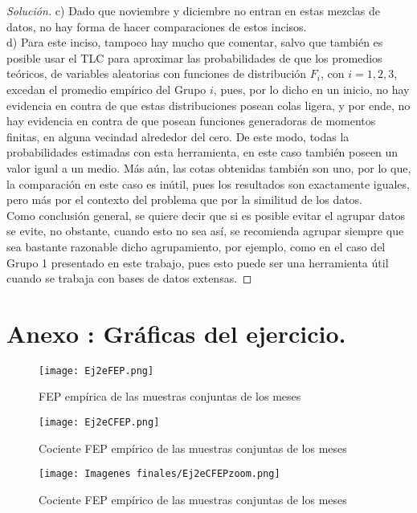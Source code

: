 \documentclass[10.5pt,notitlepage]{article}
\newenvironment{solucion}
  {\begin{proof}[Solución]}
  {\end{proof}}
\theoremstyle{plain}
\begin{document}
\begin{solucion}
c) Dado que noviembre y diciembre no entran en estas mezclas de datos, no hay forma de hacer comparaciones de estos incisos. \\


d) Para este inciso, tampoco hay mucho que comentar, salvo que también es posible usar el TLC para aproximar las probabilidades de que los promedios teóricos, de variables aleatorias con funciones de distribución \(F_i\), con \(i = 1,2,3\), excedan el promedio empírico del Grupo \(i\), pues, por lo dicho en un inicio, no hay evidencia en contra de que estas distribuciones posean colas ligera, y por ende, no hay evidencia en contra de que posean funciones generadoras de momentos finitas, en alguna vecindad alrededor del cero. De este modo, todas la probabilidades estimadas con esta herramienta, en este caso también poseen  un valor igual a un medio. Más aún, las cotas obtenidas también son uno, por lo que, la comparación en este caso es inútil, pues los resultados son exactamente iguales, pero más por el contexto del problema que por la similitud de los datos.\\

Como conclusión general, se quiere decir que si es posible evitar el agrupar datos se evite, no obstante, cuando esto no sea así, se recomienda agrupar siempre que sea bastante razonable dicho agrupamiento, por ejemplo, como en el caso del Grupo 1 presentado en este trabajo, pues esto puede ser una herramienta útil cuando se trabaja con bases de datos extensas.

\end{solucion}




\section{Anexo : Gráficas del ejercicio.}


\begin{figure}[h]
    \centering
    \texttt{[image: Ej2eFEP.png]}
    \caption{FEP empírica de las muestras conjuntas de los meses}
    \label{Ej2eFEP}
\end{figure}

\begin{figure}[h]
    \centering
    \texttt{[image: Ej2eCFEP.png]}
    \caption{Cociente FEP empírico de las muestras conjuntas de los meses}
    \label{Ej2eCFEP}
\end{figure}
\begin{figure}[h]
    \centering
    \texttt{[image: Imagenes finales/Ej2eCFEPzoom.png]}
    \caption{Cociente FEP empírico de las muestras conjuntas de los meses}
    \label{Ej2eCFEPZoom}
\end{figure}
\end{document}
